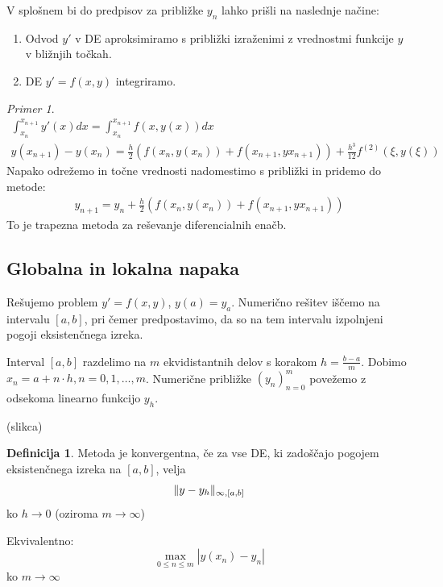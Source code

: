 \documentclass[a4paper,12pt]{article}
\DeclarePairedDelimiter\norm{\lVert}{\rVert}
\theoremstyle{definition}
\newtheorem{defn}[counter]{Definicija}
\theoremstyle{remark}
\newtheorem*{ex}{Primer}
\begin{document}
V splošnem bi do predpisov za približke $y_n$ lahko prišli na naslednje načine:

\begin{enumerate}
    \item Odvod $y'$ v DE aproksimiramo s približki izraženimi z vrednostmi funkcije $y$ v bližnjih točkah.
    \item DE $y' = f(x, y)$ integriramo.
\end{enumerate}


\begin{ex}
    \begin{gather*}
        \int_{x_n}^{x_{n+1}} y'(x) dx = \int_{x_n}^{x_{n+1}} f(x, y(x)) dx \\
        y(x_{n+1}) - y(x_n) = \frac{h}{2} (f(x_n, y(x_n)) + f(x_{n+1}, yx_{n+1})) + \frac{h^3}{12} f^{(2)}(\xi, y(\xi))
    \end{gather*}
    Napako odrežemo in točne vrednosti nadomestimo s približki in pridemo do metode:
    \begin{gather*}
        y_{n+1} = y_n + \frac{h}{2} (f(x_n, y(x_n)) + f(x_{n+1}, yx_{n+1}))
    \end{gather*}
    To je trapezna metoda za reševanje diferencialnih enačb.
\end{ex}


\subsection{Globalna in lokalna napaka}

Rešujemo problem $y' = f(x, y)$, $y(a) = y_a$. Numerično rešitev iščemo na intervalu $[a, b]$, pri čemer predpostavimo, 
da so na tem intervalu izpolnjeni pogoji eksistenčnega izreka.

Interval $[a, b]$ razdelimo na $m$ ekvidistantnih delov s korakom $h = \frac{b-a}{m}$. Dobimo $x_n = a + n \cdot h, n = 0, 1, \dots, m$.
Numerične približke $(y_n)_{n=0}^m$ povežemo z odsekoma linearno funkcijo $y_h$.

(slikca)

\begin{defn}
    Metoda je konvergentna, če za vse DE, ki zadoščajo pogojem eksistenčnega izreka na $[a, b]$, velja
    \begin{equation*}
        \norm{y-y_h}_{\infty, [a, b]}
    \end{equation*}
    ko $h \to 0$ (oziroma $m \to \infty$)
    
    Ekvivalentno:
    \begin{equation*}
        \max_{0 \leq n \leq m} |y(x_n) - y_n|
    \end{equation*}
    ko $m \to \infty$
\end{defn}
\end{document}
